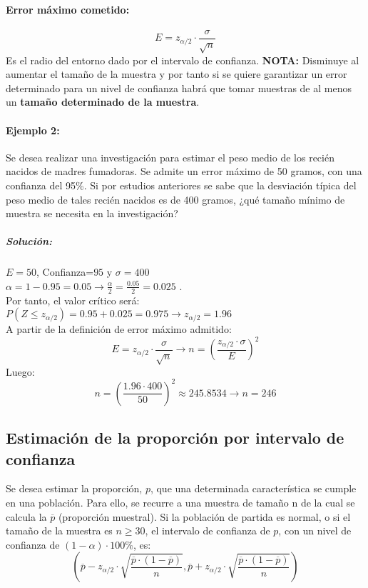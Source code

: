 \paragraph{Error máximo cometido:} $$E=z_{\alpha / 2}\cdot \frac{\sigma}{\sqrt{n}}$$
Es el radio del entorno dado por el intervalo de confianza. \textbf{NOTA:} Disminuye al aumentar el tamaño de la muestra y por tanto si se quiere garantizar un error determinado para un nivel de confianza habrá que tomar muestras de al menos un \textbf{tamaño determinado de la muestra}. 

\paragraph{Ejemplo 2:} Se desea realizar una investigación para estimar el peso medio de los recién nacidos de madres fumadoras. Se admite un error máximo de 50 gramos, con una confianza del 95\%. Si por estudios anteriores se sabe que la desviación típica del peso medio de tales recién nacidos es de 400 gramos, ¿qué tamaño mínimo de muestra se necesita en la investigación?\\

\subparagraph{Solución:}$E=50$, Confianza=$95$ y $\sigma=400$ \\
$\alpha=1-0.95=0.05 \to \frac{\alpha}{2}=\frac{0.05}{2}=0.025$
. \\ Por tanto, el valor crítico será: \\
$P\left(Z \leqslant z_{\alpha / 2} \right)= 0.95 + 0.025 = 0.975 \to z_{\alpha / 2} = 1.96$\\ A partir de la definición de error máximo admitido:
$$E=z_{\alpha / 2}\cdot \frac{\sigma}{\sqrt{n}} \to 
n = \left( \frac{z_{\alpha / 2} \cdot \sigma}{E} \right) ^ 2$$
Luego: \\
$$n = \left( \frac{1.96 \cdot 400}{50} \right) ^ 2\approx 245.8534 \to n=246
$$

\subsection{Estimación de la proporción por intervalo de confianza} Se desea estimar la proporción, $p$, que una determinada característica se cumple en una población.
Para ello, se recurre a una muestra de tamaño n de la cual se calcula la 
$\overline{p}$ (proporción muestral).
Si la población de partida es normal, o si el tamaño de la muestra es $n \geqslant 30 $, el intervalo de confianza de $p$, con un nivel de confianza de $\left( 1 - \alpha \right)\cdot 100 \% $, es: $$ \left( \overline{p} - z_{\alpha / 2}\cdot \sqrt{\frac{\overline{p}\cdot\left(1-\overline{p} \right)}{n}} ,  \overline{p} + z_{\alpha / 2}\cdot \sqrt{\frac{\overline{p}\cdot\left(1-\overline{p} \right)}{n}}\right)$$


